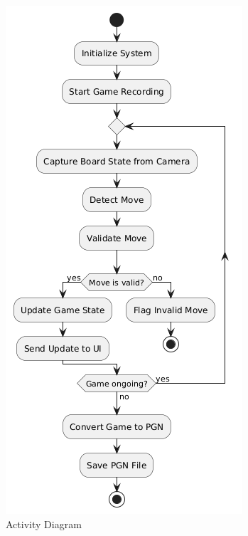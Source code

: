 \begin{figure}[h!]
\begin{minipage}[t]{0.45\textwidth}
        \includegraphics[width=\linewidth]{figures/results/uml/activity-2.png}
        \caption[Activity Diagram]{Activity Diagram}
        \label{fig:activity}
    \end{minipage}
\end{figure}

